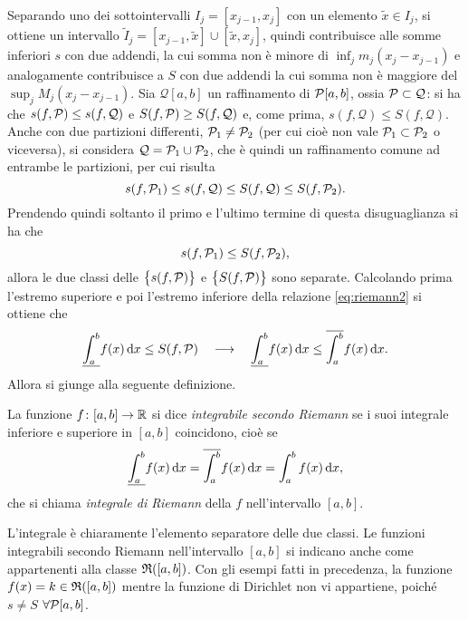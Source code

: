 Separando uno dei sottointervalli $I_j=[x_{j-1},x_j]$ con un elemento $\tilde{x}\in I_j$, si ottiene un intervallo $\tilde{I}_j=[x_{j-1},\tilde{x}]\cup[\tilde{x},x_j]$, quindi contribuisce alle somme inferiori $s$ con due addendi, la cui somma non è minore di $\inf_jm_j(x_j-x_{j-1})$ e analogamente contribuisce a $S$ con due addendi la cui somma non è maggiore del $\sup_jM_j(x_j-x_{j-1})$. %
Sia $\mathcal{Q}[a,b]$ un raffinamento di $\mathcal{P}[a,b]$, ossia $\mathcal{P}\subset\mathcal{Q}$: si ha che $s(f,\mathcal{P})\leq s(f,\mathcal{Q})$ e $S(f,\mathcal{P})\geq S(f,\mathcal{Q})$ e, come prima, $s(f,\mathcal{Q})\leq S(f,\mathcal{Q})$.
Anche con due partizioni differenti, $\mathcal{P}_1\neq\mathcal{P}_2$ (per cui cioè non vale $\mathcal{P}_1\subset\mathcal{P}_2$ o viceversa), si considera $\mathcal{Q}=\mathcal{P}_1\cup\mathcal{P}_2$, che è quindi un raffinamento comune ad entrambe le partizioni, per cui risulta
\[
s(f,\mathcal{P}_1)\leq s(f,\mathcal{Q})\leq S(f,\mathcal{Q})\leq S(f,\mathcal{P}_2).
\]
Prendendo quindi soltanto il primo e l'ultimo termine di questa disuguaglianza si ha che
\begin{equation} \label{eq:riemann2}
s(f,\mathcal{P}_1)\leq S(f,\mathcal{P}_2),
\end{equation}
allora le due classi delle $\big\{s(f,\mathcal{P})\big\}$ e $\big\{S(f,\mathcal{P})\big\}$ sono separate. Calcolando prima l'estremo superiore e poi l'estremo inferiore della relazione \eqref{eq:riemann2} si ottiene che
\[
\underline{\int_a^b} f(x)\,\textup{d} x\leq S(f,\mathcal{P})\quad\longrightarrow\quad\underline{\int_a^b} f(x)\,\textup{d} x\leq\overline{\int_a^b} f(x)\,\textup{d} x.
\]
Allora si giunge alla seguente definizione.
\begin{definizione} \label{d:riemann}
La funzione $f\colon[a,b]\to\mathbb{R}$ si dice \emph{integrabile secondo Riemann} se i suoi integrale inferiore e superiore in $[a,b]$ coincidono, cioè se
\[
\underline{\int_a^b} f(x)\,\textup{d} x=\overline{\int_a^b} f(x)\,\textup{d} x=\int_a^bf(x)\,\textup{d} x,
\]
che si chiama \emph{integrale di Riemann} della $f$ nell'intervallo $[a,b]$.
\end{definizione}
L'integrale è chiaramente l'elemento separatore delle due classi. Le funzioni integrabili secondo Riemann nell'intervallo $[a,b]$ si indicano anche come appartenenti alla classe $\mathfrak{R}([a,b])$.
Con gli esempi fatti in precedenza, la funzione $f(x)=k\in\mathfrak{R}([a,b])$ mentre la funzione di Dirichlet non vi appartiene, poiché $s\neq S$ $\forall\mathcal{P}[a,b]$.


